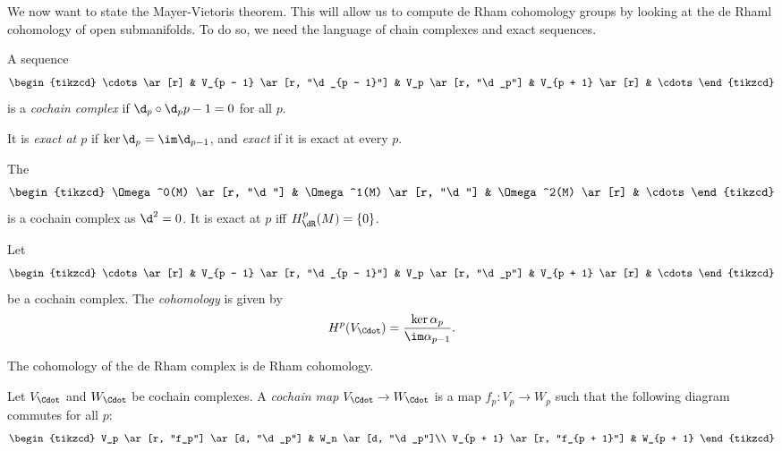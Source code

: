 \documentclass[a4paper]{article}
\begin{document}
We now want to state the Mayer-Vietoris theorem. This will allow us to compute de Rham cohomology groups by looking at the de Rhaml cohomology of open submanifolds. To do so, we need the language of chain complexes and exact sequences.

\begin{defi}
  A sequence
  \[
    \begin{tikzcd}
      \cdots \ar[r] & V_{p - 1} \ar[r, "\d_{p - 1}"] & V_p \ar[r, "\d_p"] & V_{p + 1} \ar[r] & \cdots
    \end{tikzcd}
  \]
  is a \emph{cochain complex} if $\d_p \circ \d_p{p - 1} = 0$ for all $p$.

  It is \emph{exact at $p$} if $\ker \d_p = \im \d_{p - 1}$, and \emph{exact} if it is exact at every $p$.
\end{defi}

\begin{eg}
  The 
  \[
    \begin{tikzcd}
      \Omega^0(M) \ar[r, "\d"] & \Omega^1(M) \ar[r, "\d"] & \Omega^2(M) \ar[r] & \cdots
    \end{tikzcd}
  \]
  is a cochain complex as $\d^2 = 0$. It is exact at $p$ iff $H_{\dR}^p(M) = \{0\}$.
\end{eg}

\begin{defi}[Cohomology]
  Let
  \[
    \begin{tikzcd}
      \cdots \ar[r] & V_{p - 1} \ar[r, "\d_{p - 1}"] & V_p \ar[r, "\d_p"] & V_{p + 1} \ar[r] & \cdots
    \end{tikzcd}
  \]
  be a cochain complex. The \emph{cohomology} is given by
  \[
    H^p(V_{\Cdot}) = \frac{\ker \alpha_p}{\im \alpha_{p - 1}}.
  \]
\end{defi}

\begin{eg}
  The cohomology of the de Rham complex is de Rham cohomology.
\end{eg}

\begin{defi}
  Let $V_{\Cdot}$ and $W_\Cdot$ be cochain complexes. A \emph{cochain map} $V_{\Cdot} \to W_{\Cdot}$ is a map $f_p: V_p \to W_p$ such that the following diagram commutes for all $p$:
   \[
     \begin{tikzcd}
       V_p \ar[r, "f_p"] \ar[d, "\d_p"] & W_n \ar[d, "\d_p"]\\
       V_{p + 1} \ar[r, "f_{p + 1}"] & W_{p + 1}
     \end{tikzcd}
   \]
\end{defi}
\end{document}
